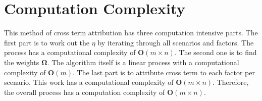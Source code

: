 \documentclass{article}
\begin{document}
\section{Computation Complexity}
This method of cross term attribution has three computation intensive parts. The first part is to work out the $ \eta $ by iterating through all scenarios and factors. The process has a computational complexity of $ \boldsymbol{O}(m \times n) $. The second one is to find the weights $ \boldsymbol{\Omega} $. The algorithm itself is a linear process with a computational complexity of $ \boldsymbol{O}(m) $. The last part is to attribute cross term to each factor per scenario. This work has a computational complexity of $ \boldsymbol{O}(m \times n) $. Therefore, the overall process has a computation complexity of $ \boldsymbol{O}(m \times n) $.
\end{document}
